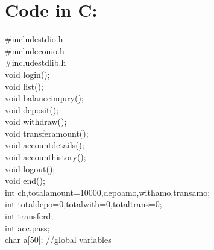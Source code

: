 \documentclass[12pt,a4 paper]{article}
\begin{document}
\section{Code in C:}
\#include\textlangle stdio.h \textrangle  \\
\#include\textlangle conio.h \textrangle    \\
\#include\textlangle stdlib.h\textrangle  \\
void login();\\
void list();\\
void balanceinqury();\\
void deposit();\\
void withdraw();\\
void transferamount();\\
void accountdetails();\\
void accounthistory();\\
void logout();\\
void end();\\

int ch,totalamount=10000,depoamo,withamo,transamo;\\
int totaldepo=0,totalwith=0,totaltrans=0;\\
int transferd;\\
int acc,pass;\\
char a[50];       //global variables\\
\end{document}
